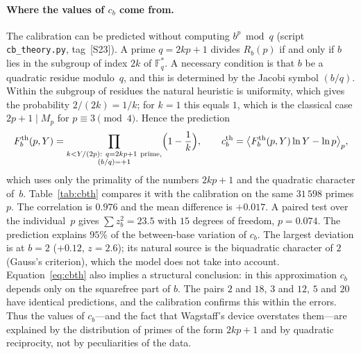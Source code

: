 \documentclass[11pt,a4paper]{article}
\theoremstyle{plain}
\theoremstyle{remark}
\newcommand{\Rb}{R_b}
\begin{document}
\paragraph{Where the values of $c_b$ come from.} The calibration can be predicted
without computing $b^p\bmod q$ (script \texttt{cb\_theory.py}, tag~[S23]). A
prime $q=2kp+1$ divides $\Rb(p)$ if and only if $b$ lies in the subgroup of
index $2k$ of $\mathbb F_q^{*}$. A necessary condition is that $b$ be a
quadratic residue modulo~$q$, and this is determined by the Jacobi symbol
$(b/q)$. Within the subgroup of residues the natural heuristic is uniformity,
which gives the probability $2/(2k)=1/k$; for $k=1$ this equals $1$, which is
the classical case $2p+1\mid M_p$ for $p\equiv3\pmod4$. Hence the prediction
\begin{equation}\label{eq:cbth}
F^{\mathrm{th}}_b(p,Y)=\prod_{\substack{k<Y/(2p):\ q=2kp+1\ \text{prime},\\ (b/q)=+1}}
\Bigl(1-\frac1k\Bigr),\qquad
c^{\mathrm{th}}_b=\bigl\langle F^{\mathrm{th}}_b(p,Y)\ln Y-\ln p\bigr\rangle_p ,
\end{equation}
which uses only the primality of the numbers $2kp+1$ and the quadratic
character of~$b$. Table~\ref{tab:cbth} compares it with the calibration on the
same $31\,598$ primes $p$. The correlation is $0.976$ and the mean difference is
$+0.017$. A paired test over the individual~$p$ gives $\sum z_b^2=23.5$ with $15$
degrees of freedom, $p=0.074$. The prediction explains $95\%$ of the
between-base variation of $c_b$. The largest deviation is at $b=2$ ($+0.12$,
$z=2.6$); its natural source is the biquadratic character of $2$ (Gauss's
criterion), which the model does not take into account. Equation~\eqref{eq:cbth}
also implies a structural conclusion: in this approximation $c_b$ depends only
on the squarefree part of $b$. The pairs $2$ and $18$, $3$ and $12$, $5$ and $20$
have identical predictions, and the calibration confirms this within the
errors. Thus the values of $c_b$---and the fact that Wagstaff's device
overstates them---are explained by the distribution of primes of the form
$2kp+1$ and by quadratic reciprocity, not by peculiarities of the data.
\end{document}
